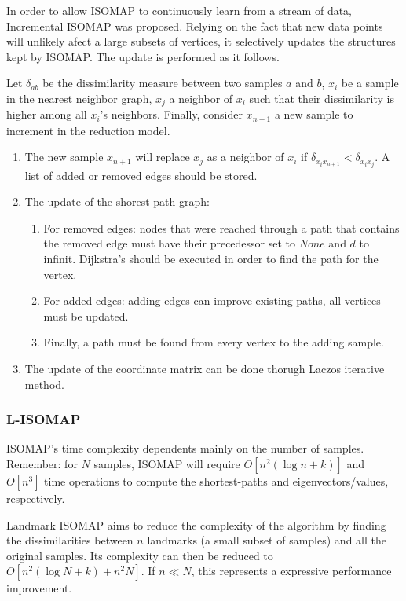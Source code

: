 \documentclass[12pt]{report}
\begin{document}
In order to allow ISOMAP to continuously learn from a stream of data, Incremental ISOMAP was proposed. \cite{law2006incremental} Relying on the fact that new data points will unlikely afect a large subsets of vertices, it selectively updates the structures kept by ISOMAP. The update is performed as it follows.

Let $\delta_{ab}$ be the dissimilarity measure between two samples $a$ and $b$, $x_i$ be a sample in the nearest neighbor graph, $x_j$ a neighbor of $x_i$ such that their dissimilarity is higher among all $x_i$'s neighbors. Finally, consider $x_{n+1}$ a new sample to increment in the reduction model.

\begin{enumerate}
	\item The new sample $x_{n+1}$ will replace $x_j$ as a neighbor of $x_i$ if $\delta_{x_ix_{n+1}} < \delta_{x_ix_j}$. A list of added or removed edges should be stored.
	
	\item The update of the shorest-path graph:
	\begin{enumerate}
		\item For removed edges: nodes that were reached through a path that contains the removed edge must have their precedessor set to $None$ and $d$ to infinit. Dijkstra's should be executed in order to find the path for the vertex.
		\item For added edges: adding edges can improve existing paths, all vertices must be updated.
		\item Finally, a path must be found from every vertex to the adding sample.
	\end{enumerate}
	
	\item The update of the coordinate matrix can be done thorugh Laczos iterative method.
\end{enumerate}

\subsubsection{L-ISOMAP}
\label{sec:lisomap}

ISOMAP's time complexity dependents mainly on the number of samples. Remember: for $N$ samples, ISOMAP will require $O[n^2(\log n + k)]$ and $O[n^3]$ time operations to compute the shortest-paths and eigenvectors/values, respectively.

Landmark ISOMAP aims to reduce the complexity of the algorithm by finding the dissimilarities between $n$ landmarks (a small subset of samples) and all the original samples. Its complexity can then be reduced to $O[n^2(\log N + k) + n^2N]$. If $n \ll N$, this represents a expressive performance improvement. \cite{silva2002global}
\end{document}
